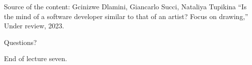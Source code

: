 \documentclass{beamer}
\begin{document}
\begin{frame}
\begin{center}
\tiny
Source of the content: Gcinizwe Dlamini, Giancarlo Succi, Nataliya Tupikina ``Is the mind of a software developer similar to that of an artist? Focus on drawing,'' Under review, 2023.
\end{center}
\end{frame}



\begin{frame}
{\centerline{Questions?}}
\vspace{1cm}
\begin{center}
    \LARGE{End of lecture seven.}
\end{center}

\end{frame}
\end{document}
